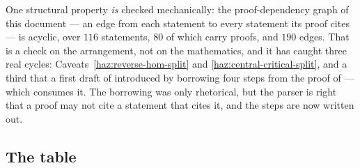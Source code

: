 One structural property \emph{is} checked mechanically: the proof-dependency
graph of this document --- an edge from each statement to every statement its
proof cites --- is acyclic, over $116$ statements, $80$ of which carry proofs,
and $190$ edges. That is a check on the arrangement, not on the mathematics,
and it has caught three real cycles: Caveats~\ref{haz:reverse-hom-split} and
\ref{haz:central-critical-split}, and a third that a first draft of
 introduced by borrowing four steps from the
proof of  --- which consumes it. The borrowing was
only rhetorical, but the parser is right that a proof may not cite a statement
that cites it, and the steps are now written out.

\subsection{The table}\label{sec:status-table}


